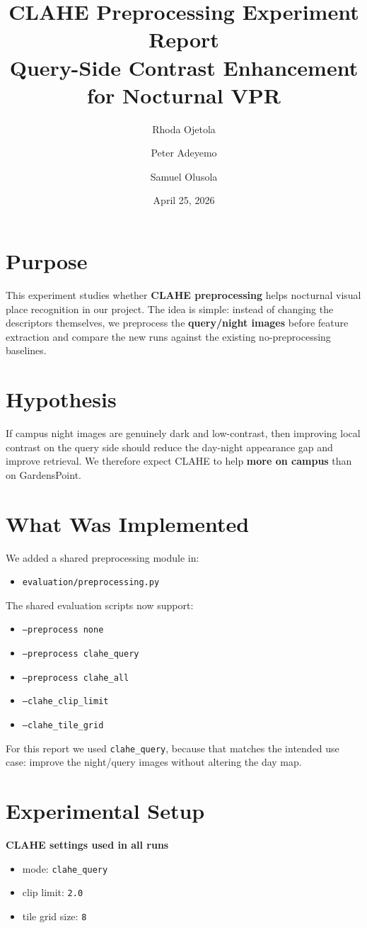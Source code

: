 \documentclass[11pt]{article}
\title{\textbf{CLAHE Preprocessing Experiment Report}\\[4pt]
Query-Side Contrast Enhancement for Nocturnal VPR}
\author{Rhoda Ojetola \and Peter Adeyemo \and Samuel Olusola}
\date{April 25, 2026}
\begin{document}
\maketitle

\section*{Purpose}
This experiment studies whether \textbf{CLAHE preprocessing} helps nocturnal visual place recognition in our project. The idea is simple: instead of changing the descriptors themselves, we preprocess the \textbf{query/night images} before feature extraction and compare the new runs against the existing no-preprocessing baselines.

\section*{Hypothesis}
If campus night images are genuinely dark and low-contrast, then improving local contrast on the query side should reduce the day-night appearance gap and improve retrieval. We therefore expect CLAHE to help \textbf{more on campus} than on GardensPoint.

\section*{What Was Implemented}
We added a shared preprocessing module in:
\begin{itemize}[leftmargin=*]
  \item \texttt{evaluation/preprocessing.py}
\end{itemize}

The shared evaluation scripts now support:
\begin{itemize}[leftmargin=*]
  \item \texttt{--preprocess none}
  \item \texttt{--preprocess clahe\_query}
  \item \texttt{--preprocess clahe\_all}
  \item \texttt{--clahe\_clip\_limit}
  \item \texttt{--clahe\_tile\_grid}
\end{itemize}

For this report we used \texttt{clahe\_query}, because that matches the intended use case: improve the night/query images without altering the day map.

\section*{Experimental Setup}
\textbf{CLAHE settings used in all runs}
\begin{itemize}[leftmargin=*]
  \item mode: \texttt{clahe\_query}
  \item clip limit: \texttt{2.0}
  \item tile grid size: \texttt{8}
\end{itemize}
\end{document}
